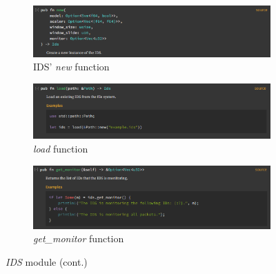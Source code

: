 \begin{figure}
    \ContinuedFloat
    \begin{subfigure}[b]{\linewidth}
        \includegraphics[width = \linewidth]{img/parts/docs/ids/ids_struct_new.png}
        \caption{IDS' \emph{new} function}
        \label{subfig:doc_ids_stuct_new}
    \end{subfigure}
    \begin{subfigure}[b]{\linewidth}
        \includegraphics[width = \linewidth]{img/parts/docs/ids/ids_struct_load.png}
        \caption{\emph{load} function}
        \label{subfig:doc_ids_stuct_load}
    \end{subfigure}
    \begin{subfigure}[b]{\linewidth}
        \includegraphics[width = \linewidth]{img/parts/docs/ids/ids_struct_getmonitor.png}
        \caption{\emph{get\_monitor} function}
        \label{subfig:doc_ids_stuct_getmonitor}
    \end{subfigure}
    \caption{\emph{IDS} module (cont.)}
    \label{fig:doc_ids}
\end{figure}
